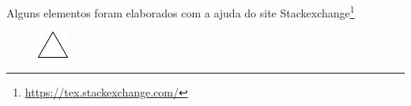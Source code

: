 \documentclass[
  11pt,				%
  oneside,			%
  a4paper,			%
  chapter=TITLE,		%
  sumario=tradicional,
  pdfencoding=unicode,
  psdextra,
  english,			%
  brazil				%
]{abntex2}
\begin{document}
\sffamily\selectfont
Alguns elementos foram elaborados com a ajuda do site Stackexchange\footnote{\url{https://tex.stackexchange.com/}}
\begin{figure}[ht!]
\includegraphics[width=1\linewidth]{triangle}
\end{figure}
\end{document}
